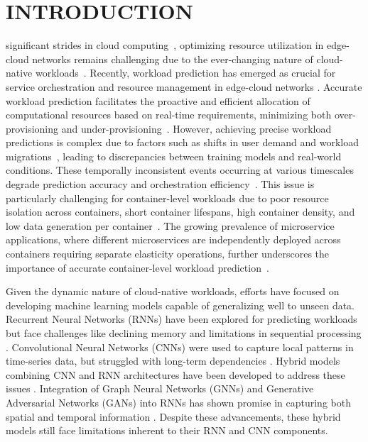 \documentclass{ieeetmlcn}
\begin{document}

\maketitle

\section{INTRODUCTION}
\label{Section: Introduction}

 significant strides in cloud computing~\cite{10229034}, optimizing resource utilization in edge-cloud networks remains challenging due to the ever-changing nature of cloud-native workloads~\cite{10646623}. Recently, workload prediction has emerged as crucial for service orchestration and resource management in edge-cloud networks \cite{10068185}. Accurate workload prediction facilitates the proactive and efficient allocation of computational resources based on real-time requirements, minimizing both over-provisioning and under-provisioning~\cite{10229064, 8258257, 9068614}. However, achieving precise workload predictions is complex due to factors such as shifts in user demand and workload migrations~\cite{ouyang2023dynamic}, leading to discrepancies between training models and real-world conditions. These temporally inconsistent events occurring at various timescales degrade prediction accuracy and orchestration efficiency~\cite{saxena2023performance}. This issue is particularly challenging for container-level workloads due to poor resource isolation across containers, short container lifespans, high container density, and low data generation per container~\cite{10417087, 10202641}. The growing prevalence of microservice applications, where different microservices are independently deployed across containers requiring separate elasticity operations, further underscores the importance of accurate container-level workload prediction~\cite{10202641, shang2023online, 10052731}.

Given the dynamic nature of cloud-native workloads, efforts have focused on developing machine learning models capable of generalizing well to unseen data. Recurrent Neural Networks (RNNs) have been explored for predicting workloads but face challenges like declining memory and limitations in sequential processing \cite{hochreiter1998vanishing, benidis2022deep}. Convolutional Neural Networks (CNNs) were used to capture local patterns in time-series data, but struggled with long-term dependencies \cite{acmtimeseriesreview2024}. Hybrid models combining CNN and RNN architectures have been developed to address these issues \cite{xu2022esdnn}. Integration of Graph Neural Networks (GNNs) and Generative Adversarial Networks (GANs) into RNNs has shown promise in capturing both spatial and temporal information \cite{li2024evogwp, RNNGAN, AGCRN}. Despite these advancements, these hybrid models still face limitations inherent to their RNN and CNN components.
\end{document}
